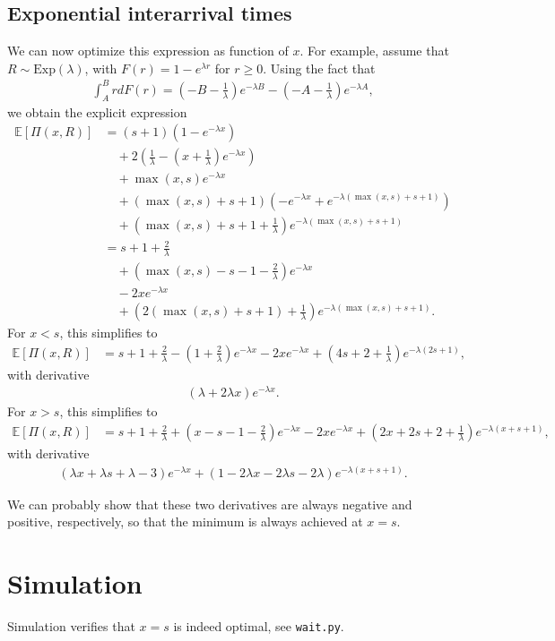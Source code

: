 \documentclass{article}
\theoremstyle{definition}
\theoremstyle{plain}
\begin{document}
\subsection*{Exponential interarrival times}
We can now optimize this expression as function of $x$. For example, assume that
$R \sim \text{Exp}(\lambda)$, with $F(r) = 1 - e^{\lambda r}$ for $r \geq 0$.
%
Using the fact that
\begin{align}
  \int_{A}^{B} r dF(r) = \left( - B - \frac{1}{\lambda} \right) e^{- \lambda B} - \left( - A - \frac{1}{\lambda} \right) e^{-\lambda A} ,
\end{align}
we obtain the explicit expression
\begin{align*}
  \mathbb{E}[\Pi(x, R)] &= (s+1) (1 - e^{-\lambda x}) \\
                        & \quad + 2 \left( \frac{1}{\lambda} - \left( x + \frac{1}{\lambda} \right) e^{-\lambda x} \right) \\
                        & \quad + \max(x,s) e^{-\lambda x} \\
                        & \quad + (\max(x,s) + s + 1) \left( -e^{-\lambda x} + e^{-\lambda (\max(x,s) + s + 1)} \right) \\
                        & \quad + \left( \max(x,s) + s + 1 + \frac{1}{\lambda} \right) e^{-\lambda(\max(x,s) + s + 1)} \\
                        &= s + 1 + \frac{2}{\lambda} \\
  & \quad + \left( \max(x,s) -s -1 - \frac{2}{\lambda}  \right) e^{-\lambda x} \\
  & \quad - 2 x e^{-\lambda x} \\
  & \quad + \left( 2 (\max(x,s) + s + 1) + \frac{1}{\lambda} \right) e^{-\lambda (\max(x,s) + s + 1)} .
\end{align*}
%
For $x < s$, this simplifies to
\begin{align*}
  \mathbb{E}[\Pi(x, R)] &= s + 1 + \frac{2}{\lambda} - \left(1 + \frac{2}{\lambda} \right) e^{-\lambda x} - 2x e^{-\lambda x} + \left( 4s + 2 + \frac{1}{\lambda} \right) e^{- \lambda (2s + 1)} ,
\end{align*}
with derivative
\begin{align*}
  (\lambda + 2 \lambda x ) e^{-\lambda x} .
\end{align*}
%
For $x > s$, this simplifies to
\begin{align*}
  \mathbb{E}[\Pi(x, R)] &= s + 1 + \frac{2}{\lambda} + \left( x - s - 1 - \frac{2}{\lambda} \right) e^{-\lambda x} - 2x e^{-\lambda x} + \left( 2x + 2s + 2 + \frac{1}{\lambda} \right) e^{-\lambda (x+s+1)},
\end{align*}
with derivative
\begin{align*}
  (\lambda x + \lambda s + \lambda - 3) e^{-\lambda x} + (1 - 2\lambda x - 2 \lambda s - 2 \lambda) e^{-\lambda(x + s + 1)} .
\end{align*}

We can probably show that these two derivatives are always negative and
positive, respectively, so that the minimum is always achieved at $x=s$.


\section*{Simulation}

Simulation verifies that $x = s$ is indeed optimal, see \texttt{wait.py}.
\end{document}
